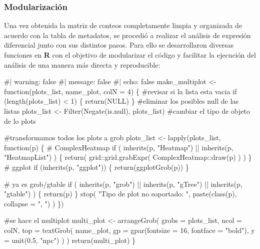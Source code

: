 \documentclass[
  10pt,
]{article}
\newenvironment{Shaded}{\begin{snugshade}}{\end{snugshade}}
\newcommand{\NormalTok}[1]{\textcolor[rgb]{0.00,0.23,0.31}{#1}}
\begin{document}
\subsubsection{Modularización}\label{modularizaciuxf3n}

Una vez obtenida la matriz de conteos completamente limpia y organizada
de acuerdo con la tabla de metadatos, se procedió a realizar el análisis
de expresión diferencial junto con sus distintos pasos. Para ello se
desarrollaron diversas funciones en \textbf{R} con el objetivo de
modularizar el código y facilitar la ejecución del análisis de una
manera más directa y reproducible:

\begin{Shaded}
\begin{Highlighting}[]
\NormalTok{\#| warning: false}
\NormalTok{\#| message: false}
\NormalTok{\#| echo: false}
\NormalTok{make\_multiplot \textless{}{-} function(plots\_list, name\_plot, colN = 4) \{}
\NormalTok{  \#revisar si la lista esta vacia}
\NormalTok{  if (length(plots\_list) \textless{} 1) \{}
\NormalTok{    return(NULL)}
\NormalTok{  \}}
\NormalTok{  \#eliminar los posibles null de las listas}
\NormalTok{  plots\_list \textless{}{-} Filter(Negate(is.null), plots\_list)}
\NormalTok{  \#cambiar el tipo de objeto de lo plots}

\NormalTok{  \#transformamos todos los plots a grob}
\NormalTok{  plots\_list \textless{}{-} lapply(plots\_list, function(p) \{}
\NormalTok{    \# ComplexHeatmap}
\NormalTok{    if (}
\NormalTok{      inherits(p, "Heatmap") ||}
\NormalTok{        inherits(p, "HeatmapList")}
\NormalTok{    ) \{}
\NormalTok{      return(}
\NormalTok{        grid::grid.grabExpr(}
\NormalTok{          ComplexHeatmap::draw(p)}
\NormalTok{        )}
\NormalTok{      )}
\NormalTok{    \}}
\NormalTok{    \# ggplot}
\NormalTok{    if (inherits(p, "ggplot")) \{}
\NormalTok{      return(ggplotGrob(p))}
\NormalTok{    \}}

\NormalTok{    \# ya es grob/gtable}
\NormalTok{    if (}
\NormalTok{      inherits(p, "grob") ||}
\NormalTok{        inherits(p, "gTree") ||}
\NormalTok{        inherits(p, "gtable")}
\NormalTok{    ) \{}
\NormalTok{      return(p)}
\NormalTok{    \}}
\NormalTok{    stop(}
\NormalTok{      "Tipo de plot no soportado: ",}
\NormalTok{      paste(class(p), collapse = ", ")}
\NormalTok{    )}
\NormalTok{  \})}

\NormalTok{  \#se hace el multiplot}
\NormalTok{  multi\_plot \textless{}{-} arrangeGrob(}
\NormalTok{    grobs = plots\_list,}
\NormalTok{    ncol = colN,}
\NormalTok{    top = textGrob(}
\NormalTok{      name\_plot,}
\NormalTok{      gp = gpar(fontsize = 16, fontface = "bold"),}
\NormalTok{      y = unit(0.5, "npc")}
\NormalTok{    )}
\NormalTok{  )}
\NormalTok{  return(multi\_plot)}
\NormalTok{\}}
\end{Highlighting}
\end{Shaded}
\end{document}
